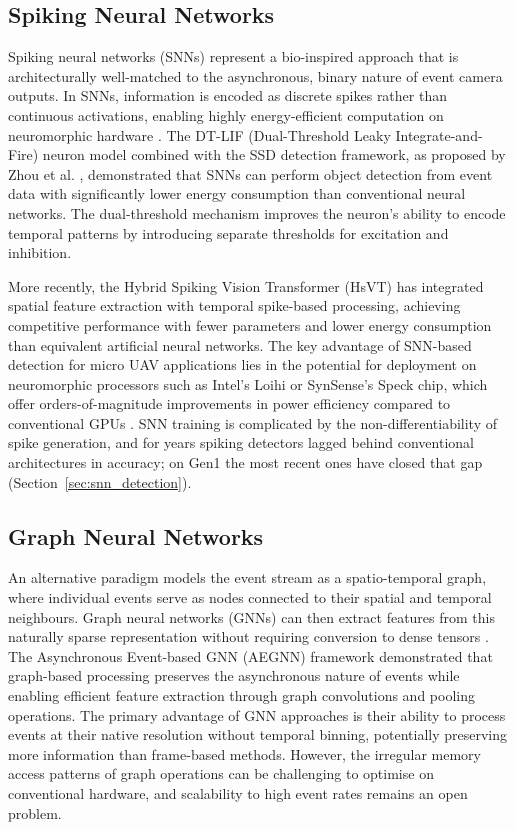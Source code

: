 \documentclass[11pt, a4paper]{report}
\begin{document}
\subsection{Spiking Neural Networks}
Spiking neural networks (SNNs) represent a bio-inspired approach that is architecturally well-matched to the asynchronous, binary nature of event camera outputs. In SNNs, information is encoded as discrete spikes rather than continuous activations, enabling highly energy-efficient computation on neuromorphic hardware \cite{roy2019towards}. The DT-LIF (Dual-Threshold Leaky Integrate-and-Fire) neuron model combined with the SSD detection framework, as proposed by Zhou et al. \cite{zhou2023dtlif}, demonstrated that SNNs can perform object detection from event data with significantly lower energy consumption than conventional neural networks. The dual-threshold mechanism improves the neuron's ability to encode temporal patterns by introducing separate thresholds for excitation and inhibition. 

More recently, the Hybrid Spiking Vision Transformer (HsVT) \cite{xu2025hybrid} has integrated spatial feature extraction with temporal spike-based processing, achieving competitive performance with fewer parameters and lower energy consumption than equivalent artificial neural networks. The key advantage of SNN-based detection for micro UAV applications lies in the potential for deployment on neuromorphic processors such as Intel's Loihi or SynSense's Speck chip, which offer orders-of-magnitude improvements in power efficiency compared to conventional GPUs \cite{synsense2026speck}. SNN training is complicated by the non-differentiability of spike generation, and for years spiking detectors lagged behind conventional architectures in accuracy; on Gen1 the most recent ones have closed that gap (Section~\ref{sec:snn_detection}). 

\subsection{Graph Neural Networks}
An alternative paradigm models the event stream as a spatio-temporal graph, where individual events serve as nodes connected to their spatial and temporal neighbours. Graph neural networks (GNNs) can then extract features from this naturally sparse representation without requiring conversion to dense tensors \cite{bi2019graph}. The Asynchronous Event-based GNN (AEGNN) framework \cite{schaefer2022aegnn} demonstrated that graph-based processing preserves the asynchronous nature of events while enabling efficient feature extraction through graph convolutions and pooling operations. The primary advantage of GNN approaches is their ability to process events at their native resolution without temporal binning, potentially preserving more information than frame-based methods. However, the irregular memory access patterns of graph operations can be challenging to optimise on conventional hardware, and scalability to high event rates remains an open problem. 
\end{document}
